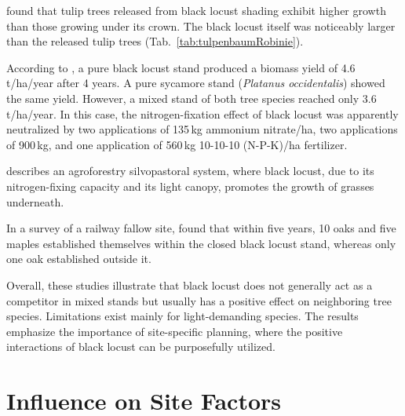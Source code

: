 \citet{beck1974robinieTulpenbaum} found that tulip trees released from black locust shading exhibit higher growth than those growing under its crown. The black locust itself was noticeably larger than the released tulip trees (Tab.~\ref{tab:tulpenbaumRobinie}).


According to \citet{dickmann1985robinieMischbestand}, a pure black locust stand produced a biomass yield of 4.6\,t/ha/year after 4 years. A pure sycamore stand (\emph{Platanus occidentalis}) showed the same yield. However, a mixed stand of both tree species reached only 3.6\,t/ha/year. In this case, the nitrogen-fixation effect of black locust was apparently neutralized by two applications of 135\,kg ammonium nitrate/ha, two applications of 900\,kg, and one application of 560\,kg 10-10-10 (N-P-K)/ha fertilizer.

\citet[pp.~467, 586]{ashton2018silviculture} describes an agroforestry silvopastoral system, where black locust, due to its nitrogen-fixing capacity and its light canopy, promotes the growth of grasses underneath.

In a survey of a railway fallow site, \citet{kowarik1996robinie} found that within five years, 10 oaks and five maples established themselves within the closed black locust stand, whereas only one oak established outside it.

Overall, these studies illustrate that black locust does not generally act as a competitor in mixed stands but usually has a positive effect on neighboring tree species. Limitations exist mainly for light-demanding species. The results emphasize the importance of site-specific planning, where the positive interactions of black locust can be purposefully utilized.


\section{Influence on Site Factors}


